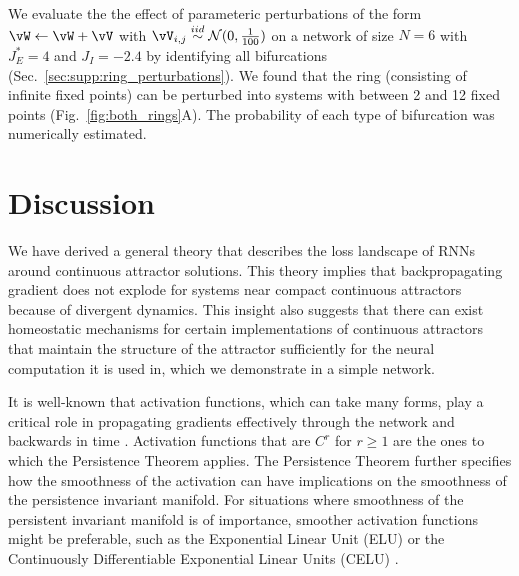 \documentclass{article} %
\newcounter{ct}
\newcommand{\iidsample}{\stackrel{iid}{\sim}}
\theoremstyle{definition}
\theoremstyle{remark}
\begin{document}
We evaluate the  the effect of parameteric perturbations of the form $ \vW \leftarrow \vW + \vV$ with $\vV_{i,j}\iidsample\mathcal{N}(0,\frac{1}{100})$ on a network of size $N = 6$ with $J_E^*= 4$ and $J_I=-2.4$ by identifying all bifurcations (Sec.~\ref{sec:supp:ring_perturbations}).
We found that the ring (consisting of infinite fixed points) can be perturbed into systems with between 2 and 12 fixed points (Fig.~\ref{fig:both_rings}A).
The probability of each type of bifurcation was numerically estimated.


\section{Discussion}
We have derived a general theory that describes the loss landscape of RNNs around continuous attractor solutions.
This theory implies that backpropagating gradient does not explode for systems near compact continuous attractors because of divergent dynamics.
This insight also suggests that there can exist homeostatic mechanisms for certain implementations of continuous attractors that maintain the structure of the attractor sufficiently for the neural computation it is used in, which we demonstrate in a simple network. 

It is well-known that activation functions, which can take many forms, play a critical role in propagating gradients effectively through the network and backwards in time \citep{jagtap2023, ramachandran2017, hayou2019}.
Activation functions that are $C^r$ for $r\geq 1$ are the ones to which the Persistence Theorem applies. 
The Persistence Theorem further specifies how the smoothness of the activation can have implications on the smoothness of the persistence invariant manifold.
For situations where smoothness of the persistent invariant manifold is of importance, smoother activation functions might be preferable, such as the Exponential Linear Unit (ELU)\citep{clevert2015} or the Continuously Differentiable Exponential Linear Units (CELU) \citep{barron2017}.





%
%
\end{document}
